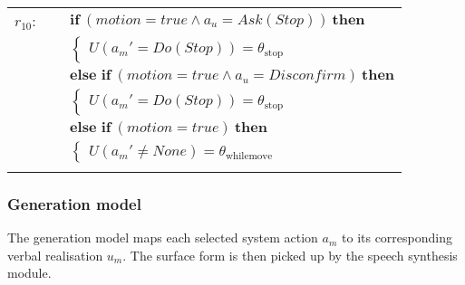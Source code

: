 \begin{footnotesize}
\begin{longtable}{p{2cm}l}
$r_{10}$: \ \ & $ \textbf{if} \ (\mathit{motion}\!=\!\mathit{true} \land \mathit{a_u}\!=\!\mathit{Ask(Stop)}) \ \textbf{then} $ \\
 & \;\;\;\;\; $ \begin{cases}U(\mathit{a_m}'\!=\!\mathit{Do(Stop)})\!=\!\theta_{\mathrm{stop}} \end{cases}$ \vspace{1mm} \\ & $ \textbf{else if} \ (\mathit{motion}\!=\!\mathit{true} \land \mathit{a_u}\!=\!\mathit{Disconfirm}) \ \textbf{then}$ \\
& \;\;\;\;\; $ \begin{cases}U(\mathit{a_m}'\!=\!\mathit{Do(Stop)})\!=\!\theta_{\mathrm{stop}} \end{cases}$ \vspace{1mm} \\ & $ \textbf{else if} \ (\mathit{motion}\!=\!\mathit{true}) \ \textbf{then}$ \\
& \;\;\;\;\; $ \begin{cases}U(\mathit{a_m}'\!\neq\!\mathit{None})\!=\!\theta_{\mathrm{whilemove}} \end{cases}$ \\ \\[-1mm]
\end{longtable}
\end{footnotesize}

\subsubsection*{Generation model}

The generation model maps each selected system action $a_m$ to its corresponding verbal realisation $u_m$.  The surface form is then picked up by the speech synthesis module.
 
